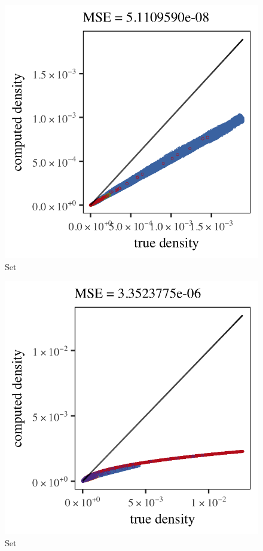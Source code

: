 \begin{subfigure}{0.3\textwidth}
	\centering
	\includegraphics[keepaspectratio=true, width=\textwidth, height=0.23\textheight]{4/img/results_baakman_2_600000_mbe_silverman}
	\caption{Set \baakmanTwo}
	\label{fig:4:simulated:datasets:mbe:baakman2}
\end{subfigure}	
\begin{subfigure}{0.3\textwidth}
	\centering
	\includegraphics[keepaspectratio=true, width=\textwidth, height=0.23\textheight]{4/img/results_baakman_3_1200000_mbe_silverman}
	\caption{Set \baakmanThree}
	\label{fig:4:simulated:datasets:mbe:baakman3}
\end{subfigure}				
